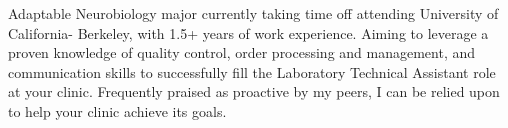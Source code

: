 Adaptable Neurobiology major currently taking time off attending University of California- Berkeley, with 1.5+ years of work experience. 
Aiming to leverage a proven knowledge of quality control, order processing and management, and communication skills to successfully fill the Laboratory Technical Assistant role at your clinic. 
Frequently praised as proactive by my peers, I can be relied upon to help your clinic achieve its goals.